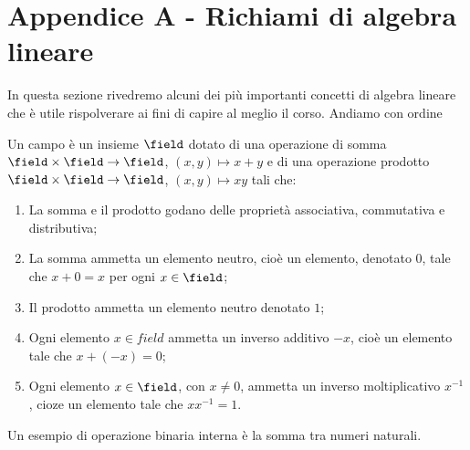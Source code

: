 \chapter{Appendice A - Richiami di algebra lineare}
\label{sec:algebra}
In questa sezione rivedremo alcuni dei più importanti concetti di algebra lineare che è utile rispolverare ai fini di capire al meglio il corso.
Andiamo con ordine

\begin{definition} [Campo]
    Un campo è un insieme $\field$ dotato di una operazione di somma $\field \times \field \rightarrow \field$, $(x, y) \mapsto x + y$ e di una operazione prodotto $\field \times \field \rightarrow \field$, $(x, y) \mapsto xy$ tali che:
    \begin{enumerate}
        \renewcommand{\labelenumi}{\roman{enumi}.}
        \item La somma e il prodotto godano delle proprietà associativa, commutativa e distributiva;
        \item La somma ammetta un elemento neutro, cioè un elemento, denotato $0$, tale che $x + 0 = x$ per ogni $x \in \field$;
        \item Il prodotto ammetta un elemento neutro denotato $1$;
        \item Ogni elemento $x \in field$ ammetta un inverso additivo $-x$, cioè un elemento tale che $x + (-x) = 0$;
        \item Ogni elemento $x \in \field$, con $x \neq 0$, ammetta un inverso moltiplicativo $x^{-1}$, cioze un elemento tale che $xx^{-1} = 1$.
      \end{enumerate}
\end{definition}
Un esempio di operazione binaria interna è la somma tra numeri naturali. 
